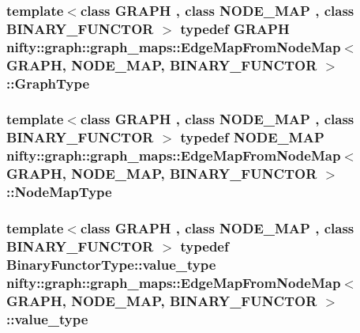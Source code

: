 \subsubsection[{Graph\+Type}]{\setlength{\rightskip}{0pt plus 5cm}template$<$class G\+R\+A\+P\+H , class N\+O\+D\+E\+\_\+\+M\+A\+P , class B\+I\+N\+A\+R\+Y\+\_\+\+F\+U\+N\+C\+T\+O\+R $>$ typedef G\+R\+A\+P\+H {\bf nifty\+::graph\+::graph\+\_\+maps\+::\+Edge\+Map\+From\+Node\+Map}$<$ G\+R\+A\+P\+H, N\+O\+D\+E\+\_\+\+M\+A\+P, B\+I\+N\+A\+R\+Y\+\_\+\+F\+U\+N\+C\+T\+O\+R $>$\+::{\bf Graph\+Type}}\label{classnifty_1_1graph_1_1graph__maps_1_1EdgeMapFromNodeMap_a551dfc3ef2c5293f5306420d129da574}
\hypertarget{classnifty_1_1graph_1_1graph__maps_1_1EdgeMapFromNodeMap_ad2639421843e9da9afe18b0b35a7317e}{}
\subsubsection[{Node\+Map\+Type}]{\setlength{\rightskip}{0pt plus 5cm}template$<$class G\+R\+A\+P\+H , class N\+O\+D\+E\+\_\+\+M\+A\+P , class B\+I\+N\+A\+R\+Y\+\_\+\+F\+U\+N\+C\+T\+O\+R $>$ typedef N\+O\+D\+E\+\_\+\+M\+A\+P {\bf nifty\+::graph\+::graph\+\_\+maps\+::\+Edge\+Map\+From\+Node\+Map}$<$ G\+R\+A\+P\+H, N\+O\+D\+E\+\_\+\+M\+A\+P, B\+I\+N\+A\+R\+Y\+\_\+\+F\+U\+N\+C\+T\+O\+R $>$\+::{\bf Node\+Map\+Type}}\label{classnifty_1_1graph_1_1graph__maps_1_1EdgeMapFromNodeMap_ad2639421843e9da9afe18b0b35a7317e}
\hypertarget{classnifty_1_1graph_1_1graph__maps_1_1EdgeMapFromNodeMap_abc24027c855755008ba3694cc49999c2}{}
\subsubsection[{value\+\_\+type}]{\setlength{\rightskip}{0pt plus 5cm}template$<$class G\+R\+A\+P\+H , class N\+O\+D\+E\+\_\+\+M\+A\+P , class B\+I\+N\+A\+R\+Y\+\_\+\+F\+U\+N\+C\+T\+O\+R $>$ typedef Binary\+Functor\+Type\+::value\+\_\+type {\bf nifty\+::graph\+::graph\+\_\+maps\+::\+Edge\+Map\+From\+Node\+Map}$<$ G\+R\+A\+P\+H, N\+O\+D\+E\+\_\+\+M\+A\+P, B\+I\+N\+A\+R\+Y\+\_\+\+F\+U\+N\+C\+T\+O\+R $>$\+::{\bf value\+\_\+type}}\label{classnifty_1_1graph_1_1graph__maps_1_1EdgeMapFromNodeMap_abc24027c855755008ba3694cc49999c2}


